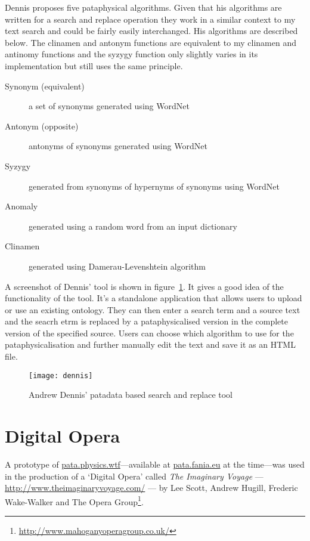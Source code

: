 Dennis proposes five pataphysical algorithms. Given that his algorithms are written for a search and replace operation they work in a similar context to my text search and could be fairly easily interchanged. His algorithms are described below. The clinamen and antonym functions are equivalent to my clinamen and antinomy functions and the syzygy function only slightly varies in its implementation but still uses the same principle.

\begin{description}
  \item[Synonym (equivalent)] a set of synonyms generated using WordNet
  \item[Antonym (opposite)] antonyms of synonyms generated using WordNet
  \item[Syzygy] generated from synonyms of hypernyms of synonyms using WordNet
  \item[Anomaly] generated using a random word from an input dictionary
  \item[Clinamen] generated using Damerau-Levenshtein algorithm
\end{description}

A screenshot of Dennis' tool is shown in figure~\ref{fig:dennis}. It gives a good idea of the functionality of the tool. It's a standalone application that allows users to upload or use an existing ontology. They can then enter a search term and a source text and the seacrh etrm is replaced by a pataphysicalised version in the complete version of the specified source. Users can choose which algorithm to use for the pataphysicalisation and further manually edit the text and save it as an \ac{HTML} file.

\begin{figure}[!htbp]
  \centering
  \texttt{[image: dennis]}
\caption[Andrew Dennis' Search and Replace]{Andrew Dennis' patadata based search and replace tool}
\label{fig:dennis}
\end{figure}



\section{Digital Opera}

A prototype of \url{pata.physics.wtf}---available at \url{pata.fania.eu} at the time---was used in the production of a `Digital Opera' called \emph{The Imaginary Voyage} --- \url{http://www.theimaginaryvoyage.com/} --- by Lee Scott, Andrew Hugill, Frederic Wake-Walker and The Opera Group\footnote{\url{http://www.mahoganyoperagroup.co.uk/}}.

